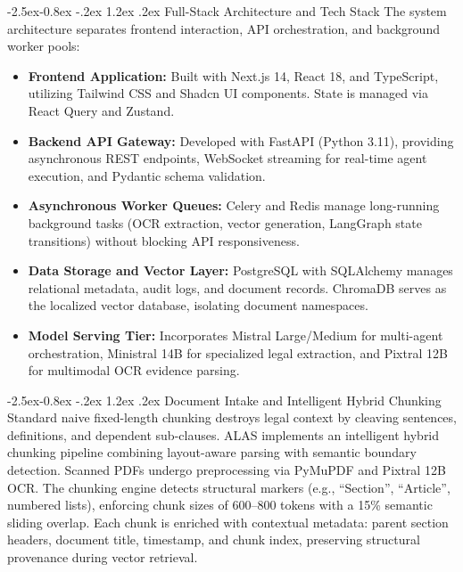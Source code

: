 \documentclass[3p,times,procedia]{elsarticle}
\makeatletter
\renewcommand\subsection{\@startsection{subsection}{2}{\z@}%
                                     {-2.5ex\@plus -0.8ex \@minus -.2ex}%
                                     {1.2ex \@plus .2ex}%
                                     {\fontsize{10}{12}\selectfont\itshape}}
\makeatother
\begin{document}
\subsection{Full-Stack Architecture and Tech Stack}
The system architecture separates frontend interaction, API orchestration, and background worker pools:
\begin{itemize}
\setlength{\itemsep}{0pt}\setlength{\parskip}{0pt}
\item \textbf{Frontend Application:} Built with Next.js 14, React 18, and TypeScript, utilizing Tailwind CSS and Shadcn UI components. State is managed via React Query and Zustand.
\item \textbf{Backend API Gateway:} Developed with FastAPI (Python 3.11), providing asynchronous REST endpoints, WebSocket streaming for real-time agent execution, and Pydantic schema validation.
\item \textbf{Asynchronous Worker Queues:} Celery and Redis manage long-running background tasks (OCR extraction, vector generation, LangGraph state transitions) without blocking API responsiveness.
\item \textbf{Data Storage and Vector Layer:} PostgreSQL with SQLAlchemy manages relational metadata, audit logs, and document records. ChromaDB serves as the localized vector database, isolating document namespaces.
\item \textbf{Model Serving Tier:} Incorporates Mistral Large/Medium for multi-agent orchestration, Ministral 14B for specialized legal extraction, and Pixtral 12B for multimodal OCR evidence parsing.
\end{itemize}

\subsection{Document Intake and Intelligent Hybrid Chunking}
Standard naive fixed-length chunking destroys legal context by cleaving sentences, definitions, and dependent sub-clauses. ALAS implements an intelligent hybrid chunking pipeline combining layout-aware parsing with semantic boundary detection. Scanned PDFs undergo preprocessing via PyMuPDF and Pixtral 12B OCR. The chunking engine detects structural markers (e.g., ``Section'', ``Article'', numbered lists), enforcing chunk sizes of 600--800 tokens with a 15\% semantic sliding overlap. Each chunk is enriched with contextual metadata: parent section headers, document title, timestamp, and chunk index, preserving structural provenance during vector retrieval.
\end{document}
